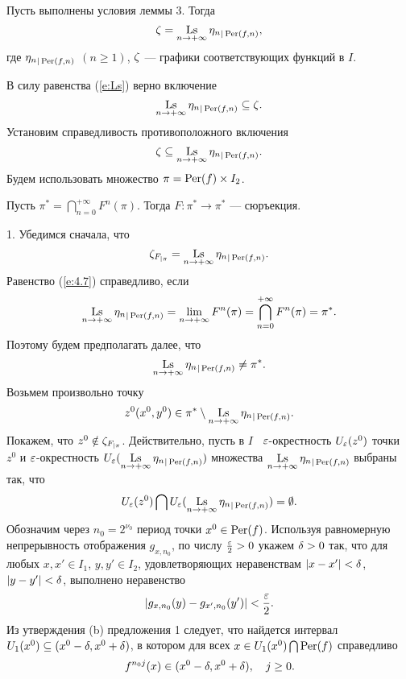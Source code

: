 \begin{lem}
Пусть выполнены условия леммы $3$. Тогда
$$
\ze=\Ls\limits_{n\to +\infty}{\eta_n}_{| \Per(f, n)},
$$
где ${\eta_n}_{| \operatorname{Per}(f, n)}$ $(n\geq 1)$, $\zeta$ --- графики
соответствующих функций в $I$.
\end{lem}


\begin{pf}
В силу равенства (\ref{e:Ls}) верно включение
\begin{equation}\label{e:4.5}
\Ls\limits_{n\to +\infty}
{\eta_n}_{| \Per(f, n)}\subseteq\ze.
\end{equation}
Установим справедливость противоположного включения
\begin{equation}\label{e:4.6}
\ze\subseteq\Ls\limits_{n\to +\infty}
{\eta_n}_{| \Per(f, n)}.
\end{equation}
Будем использовать множество $\pi=\operatorname{Per}(f)\times I_2$.

Пусть $\pi^*=\bigcap\limits_{n=0}^{+\infty}F^n(\pi)$.
Тогда $F: \pi^*\to \pi^*$ --- сюръекция.

1. Убедимся сначала, что
\begin{equation}\label{e:4.7}
\ze_{F_{| \pi}}=\Ls\limits_{n\to +\infty}{\eta_n}_{|
\Per(f, n)}.
\end{equation}
Равенство (\ref{e:4.7}) справедливо, если
$$
\Ls\limits_{n\to
+\infty}{\eta_n}_{| \Per(f, n)} =\lim_{n\to
+\infty}F^n(\pi)= \bigcap\limits_{n=0}^{+\infty}F^n(\pi)=\pi^*.
$$
Поэтому будем предполагать далее, что
\begin{equation}\label{e:4.7^*}
\Ls\limits_{n\to +\infty}{\eta_n}_{|\Per(f, n)} \ne \pi^*.
\end{equation}
Возьмем произвольно точку
\begin{equation}\label{e:4.7^{**}}
z^0(x^0, y^0)\in
\pi^*\setminus\Ls\limits_ {n\to +\infty}{\eta_n}_{| \Per(f,n)}.
\end{equation}
Покажем, что $z^0\notin\zeta_{F_{| \pi}}$. Действительно, пусть
в $I$  \ $\varepsilon$-окрестность $U_{\varepsilon}(z^0)$ точки $z^0$ и $\varepsilon$-окрест\-ность 
$U_{\e}(\Ls\limits_{n\to +\infty}{\eta_n}_{|\Per(f, n)})$ множества
$\Ls\limits_{n\to +\infty}{\eta_n}_{|\Per(f, n)}$ выбраны так, что
\begin{equation}\label{e:4.8}
U_{\e}(z^0)\bigcap
U_{\e}(\Ls\limits_{n\to +\infty}{\eta_n}_{|\Per(f, n)})=\emptyset.
\end{equation}
Обозначим через $n_0=2^{\nu_0}$ период точки $x^0\in \operatorname{Per}(f)$.
Используя равномерную непрерывность отображения $g_{x, n_0}$,
по числу $\frac{\varepsilon}{2}> 0$ укажем $\delta> 0$ так, что
для любых $x, x'\in I_1$, $y, y'\in I_2$, удовлетворяющих
неравенствам $|x - x'|<\delta$, $|y - y'|<\delta$, выполнено неравенство
\begin{equation}\label{e:4.9}
|g_{x, n_0}(y) - g_{x', n_0}(y')|<\frac{\varepsilon}{2}.
\end{equation}
Из утверждения (b) предложения 1 следует, что найдется интервал 
$U_1(x^0)\subseteq (x^0 -\delta, x^0 +\delta)$, в котором для
всех $x\in U_1(x^0)\bigcap \operatorname{Per}(f)$ справедливо
\begin{equation}\label{e:4.10}
f^{n_0j}(x)\in (x^0 -\delta, x^0 +\delta),\quad  j\geq 0.
\end{equation}


\end{pf}
